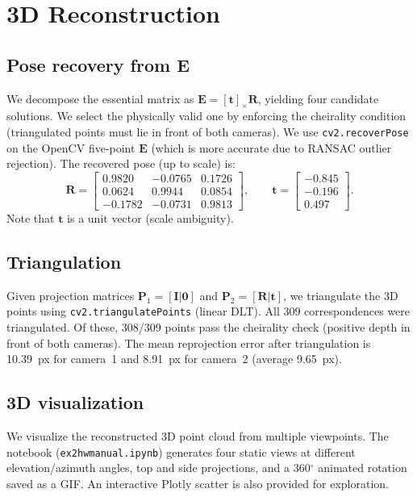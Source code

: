 \documentclass{article}
\begin{document}
\section{3D Reconstruction}

\subsection{Pose recovery from $\mathbf{E}$}
We decompose the essential matrix as $\mathbf{E}=[\mathbf{t}]_\times\mathbf{R}$, yielding four candidate solutions.
We select the physically valid one by enforcing the cheirality condition (triangulated points must lie in front of both cameras).
We use \texttt{cv2.recoverPose} on the OpenCV five-point $\mathbf{E}$ (which is more accurate due to RANSAC outlier rejection). The recovered pose (up to scale) is:
\begin{equation}
\mathbf{R}=
\begin{bmatrix}
 0.9820 & -0.0765 &  0.1726 \\
 0.0624 &  0.9944 &  0.0854 \\
-0.1782 & -0.0731 &  0.9813
\end{bmatrix},
\qquad
\mathbf{t}=
\begin{bmatrix}
-0.845 \\
-0.196 \\
 0.497
\end{bmatrix}.
\end{equation}
Note that $\mathbf{t}$ is a unit vector (scale ambiguity).

\subsection{Triangulation}
Given projection matrices $\mathbf{P}_1=[\mathbf{I}|\mathbf{0}]$ and $\mathbf{P}_2=[\mathbf{R}|\mathbf{t}]$,
we triangulate the 3D points using \texttt{cv2.triangulatePoints} (linear DLT).
All 309 correspondences were triangulated. Of these, 308/309 points pass the cheirality check (positive depth in front of both cameras). The mean reprojection error after triangulation is 10.39~px for camera~1 and 8.91~px for camera~2 (average 9.65~px).

\subsection{3D visualization}
We visualize the reconstructed 3D point cloud from multiple viewpoints. The notebook (\texttt{ex2hwmanual.ipynb}) generates four static views at different elevation/azimuth angles, top and side projections, and a 360$^\circ$ animated rotation saved as a GIF. An interactive Plotly scatter is also provided for exploration.
\end{document}
